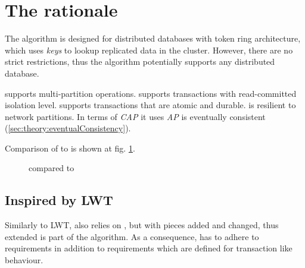 
\section{The rationale}
The \mpp algorithm is designed for distributed databases with token ring architecture,
which uses \emph{keys} to lookup replicated data in the cluster. However, there are no strict restrictions, thus the algorithm potentially supports any distributed database.

\mpp supports multi-partition operations.
\mpp supports transactions with read-committed isolation level. 
\mpp supports transactions that are atomic and durable.
\mpp is resilient to network partitions. In terms of \emph{CAP} \cite{Brewer:2012ba} it uses \emph{AP}
\mpp is eventually consistent (\ref{sec:theory:eventualConsistency}). 

Comparison of \mpp to \lwt is shown at fig. \ref{fig:mppVsLwt}.

\begin{figure}[hbt]
  \setlength{\unitlength}{1.3cm}  
  \caption{\mpp compared to \lwt}
  \label{fig:mppVsLwt}
\end{figure}



\subsection{Inspired by LWT}
Similarly to LWT, \mpp also relies on \paxos, but with pieces added and changed, thus extended
\paxos is part of the \mpp algorithm. As a consequence, \mpp has to adhere to \paxos requirements in addition to requirements which are defined for transaction like behaviour. 


